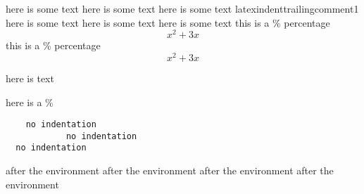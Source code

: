 \begin{myenvironment}
		here is some text       %
		here is some text
		here is some text %
		latexindenttrailingcomment1
		here is some text
		here is some text %
		here is some text %
		this is a \% percentage \begin{equation}
			x^2+3x
		\end{equation} this is a \% percentage \begin{equation}
			x^2+3x
		\end{equation} \begin{myenv} here is text \end{myenv}
		here is a \% \begin{verbatim}
    no indentation
            no indentation
  no indentation
		\end{verbatim}
\end{myenvironment}
after the environment%
after the environment       %
after the environment  %
after the environment%
